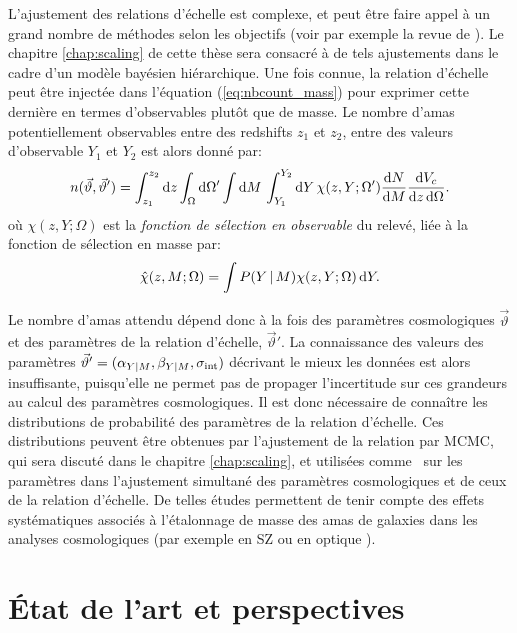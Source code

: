 L'ajustement des relations d'échelle est complexe, et peut être faire appel à un grand nombre de méthodes selon les objectifs (voir par exemple la revue de \cite{andreon_measurement_2013}).
Le chapitre \ref{chap:scaling} de cette thèse sera consacré à de tels ajustements dans le cadre d'un modèle bayésien hiérarchique.
Une fois connue, la relation d'échelle peut être injectée dans l'équation (\ref{eq:nbcount_mass}) pour exprimer cette dernière en termes d'observables plutôt que de masse.
Le nombre d'amas potentiellement observables entre des redshifts $z_1$ et $z_2$, entre des valeurs d'observable $Y_1$ et $Y_2$ est alors donné par:
\begin{equation}
    \label{eq:nbcount_obs}
    n(\vec{\vartheta}, \vec{\vartheta}')
    = \int_{z_1}^{z_2} \mathrm{d} z
      \int_\Omega \mathrm{d}\Omega'
      \int \mathrm{d} M \,
      \int_{Y_1}^{Y_2} \mathrm{d} Y \,
        \chi(z, Y; \Omega') \frac{\mathrm{d} N}{\mathrm{d} M} \frac{\mathrm{d} V_c}{\mathrm{d} z \, \mathrm{d}\Omega}.
\end{equation}
où $\chi(z, Y; \Omega)$ est la \textit{fonction de sélection en observable} du relevé, liée à la fonction de sélection en masse par:
\begin{equation}
    \label{}
    \hat{\chi}(z, M ; \Omega) = \int P(Y \,|\, M) \chi(z, Y ; \Omega) \, \mathrm{d} Y.
\end{equation}

Le nombre d'amas attendu dépend donc à la fois des paramètres cosmologiques $\vec{\vartheta}$ et des paramètres de la relation d'échelle, $\vec{\vartheta}'$.
La connaissance des valeurs des paramètres $\vec{\vartheta}' = (\alpha_{Y|M}, \beta_{Y|M}, \sigma_{\rm int})$ décrivant le mieux les données est alors insuffisante, puisqu'elle ne permet pas de propager l'incertitude sur ces grandeurs au calcul des paramètres cosmologiques.
Il est donc nécessaire de connaître les distributions de probabilité des paramètres de la relation d'échelle.
Ces distributions peuvent être obtenues par l'ajustement de la relation par MCMC, qui sera discuté dans le chapitre \ref{chap:scaling}, et utilisées comme \prior\ sur les paramètres dans l'ajustement simultané des paramètres cosmologiques et de ceux de la relation d'échelle.
De telles études permettent de tenir compte des effets systématiques associés à l'étalonnage de masse des amas de galaxies dans les analyses cosmologiques (par exemple en SZ \cite{bocquet_cluster_2019} ou en optique \cite{des_collaboration_dark_2020}).

\section{État de l'art et perspectives}

